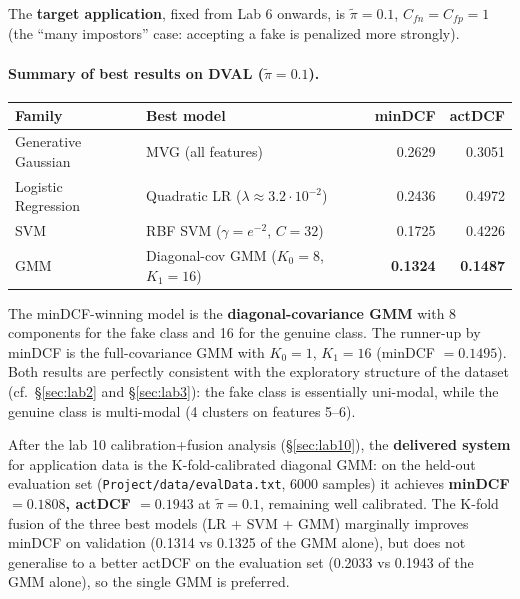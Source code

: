 \documentclass[11pt,a4paper]{article}
\begin{document}
The \textbf{target application}, fixed from Lab 6 onwards, is
$\tilde{\pi}=0.1$, $C_{fn}=C_{fp}=1$ (the ``many impostors'' case:
accepting a fake is penalized more strongly).

\paragraph{Summary of best results on DVAL ($\tilde{\pi}=0.1$).}

\begin{table}[H]
\centering
\begin{tabular}{llrr}
\toprule
Family                  & Best model                                   & minDCF & actDCF \\
\midrule
Generative Gaussian     & MVG (all features)                           & 0.2629 & 0.3051 \\
Logistic Regression     & Quadratic LR ($\lambda \approx 3.2\cdot 10^{-2}$) & 0.2436 & 0.4972 \\
SVM                     & RBF SVM ($\gamma=e^{-2}$, $C=32$)             & 0.1725 & 0.4226 \\
GMM                     & Diagonal-cov GMM ($K_0=8$, $K_1=16$)         & \textbf{0.1324} & \textbf{0.1487} \\
\bottomrule
\end{tabular}
\end{table}

The minDCF-winning model is the \textbf{diagonal-covariance GMM} with
8 components for the fake class and 16 for the genuine class. The
runner-up by minDCF is the full-covariance GMM with $K_0=1$, $K_1=16$
(minDCF $= 0.1495$). Both results are perfectly consistent with the
exploratory structure of the dataset (cf.\ \S\ref{sec:lab2} and
\S\ref{sec:lab3}): the fake class is essentially uni-modal, while the
genuine class is multi-modal (4 clusters on features 5--6).

\medskip
After the lab 10 calibration+fusion analysis (\S\ref{sec:lab10}), the
\textbf{delivered system} for application data is the
K-fold-calibrated diagonal GMM: on the held-out evaluation set
(\texttt{Project/data/evalData.txt}, 6000 samples) it achieves
\textbf{minDCF $=0.1808$, actDCF $=0.1943$} at $\tilde{\pi}=0.1$,
remaining well calibrated. The K-fold fusion of the three best
models (LR + SVM + GMM) marginally improves minDCF on validation
(0.1314 vs 0.1325 of the GMM alone), but does not generalise to a
better actDCF on the evaluation set (0.2033 vs 0.1943 of the GMM
alone), so the single GMM is preferred.
\end{document}

